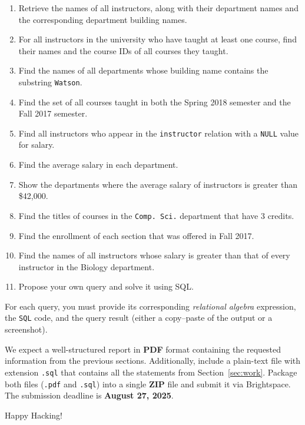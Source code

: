 \documentclass{article}
\begin{document}
\begin{enumerate}
  \item Retrieve the names of all instructors, along with their department names and the corresponding department building names.
  \item For all instructors in the university who have taught at least one course, find their names and the course IDs of all courses they taught.
  \item Find the names of all departments whose building name contains the substring \texttt{Watson}.
  \item Find the set of all courses taught in both the Spring 2018 semester and the Fall 2017 semester.
  \item Find all instructors who appear in the \texttt{instructor} relation with a \texttt{NULL} value for salary.
  \item Find the average salary in each department.
  \item Show the departments where the average salary of instructors is greater than \$42{,}000.
  \item Find the titles of courses in the \texttt{Comp. Sci.} department that have 3 credits.
  \item Find the enrollment of each section that was offered in Fall 2017.
  \item Find the names of all instructors whose salary is greater than that of every instructor in the Biology department.
  \item Propose your own query and solve it using SQL.
\end{enumerate}

For each query, you must provide its corresponding \textit{relational algebra} expression, the \texttt{SQL} code, and the query result (either a copy–paste of the output or a screenshot).

We expect a well-structured report in \textbf{PDF} format containing the requested information from the previous sections. Additionally, include a plain-text file with extension \texttt{.sql} that contains all the statements from Section~\ref{sec:work}. Package both files (\texttt{.pdf} and \texttt{.sql}) into a single \textbf{ZIP} file and submit it via Brightspace. The submission deadline is \textbf{August 27, 2025}.

\vspace{5mm}
Happy Hacking! 
\end{document}
